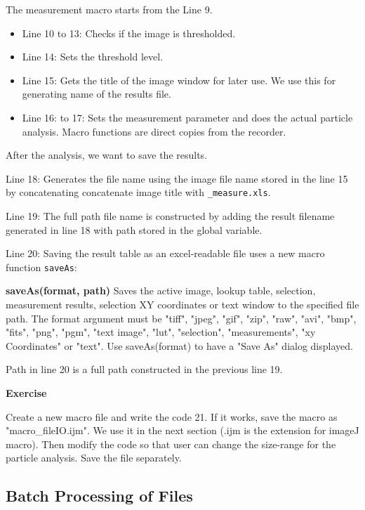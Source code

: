 \documentclass[11pt,a4paper,oneside]{report}
\newenvironment{indentexercise}[1]%
{{\setlength{\leftmargin}{2em}}%
\textbf{Exercise \thesubsection-#1}%
\begin{list}{}%
	\item%
}
{\end{list}}
\newenvironment{indentCom}%
{\begin{list}{}%
         {\setlength{\leftmargin}{1em}}%
         \item[]%
}
{\end{list}}
\newcommand{\ilcom}[1]{\texttt{\small#1}}
\begin{document}
The measurement macro starts from the Line 9. 
\begin{itemize}
\item Line 10 to 13: Checks if the image is thresholded. 
\item Line 14: Sets the threshold level. 
\item Line 15: Gets the title of the image window for later use. We use this for 
generating name of the results file.
\item Line 16: to 17: Sets the measurement parameter and does the actual 
particle analysis. Macro functions are direct copies from the recorder. 
\end{itemize}
After the analysis, we want to save the results. 
\begin{itemize}
\item Line 18: Generates the file name using the image file name stored in the line 15 by concatenating concatenate image title with \ilcom{\_measure.xls}. 
\item Line 19: The full path file name is constructed by adding the result filename generated in line 18 with path stored in the global variable. 
\item Line 20: Saving the result table as an excel-readable file uses a new macro function \ilcom{saveAs}:
\begin{indentCom}
\textbf{saveAs(format, path)}
Saves the active image, lookup table, selection, measurement results, selection XY coordinates or text window to the specified file path. The format argument must be "tiff", "jpeg", "gif", "zip", "raw", "avi", "bmp", "fits", "png", "pgm", "text image", "lut", "selection", "measurements", "xy Coordinates" or "text". Use saveAs(format) to have a "Save As" dialog displayed.
\end{indentCom}
Path in line 20 is a full path constructed in the previous line 19.
\end{itemize}

\begin{indentexercise}{1}
Create a new macro file and write the code 21. If it works, save the macro as "macro\_fileIO.ijm". We use it in the next section (.ijm is the extension for imageJ macro). 
Then modify the code so that user can change the size-range for the particle analysis. Save the file separately.   
\end{indentexercise}

\subsection{Batch Processing of Files}
\end{document}
